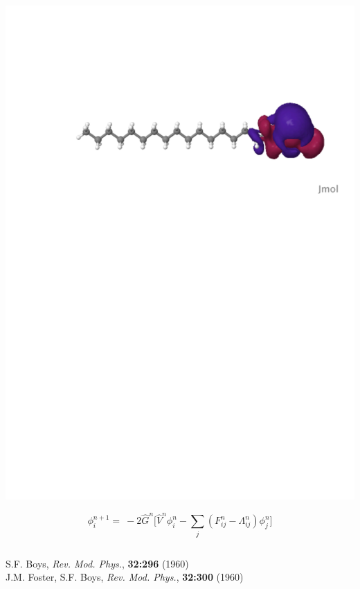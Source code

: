 \documentclass[mathserif, 10pt]{beamer}
\begin{document}
\begin{frame}
\begin{columns}
\begin{column}[b]{0.48\linewidth}
{    \includegraphics[scale=0.25, clip, viewport = 80 560 600 700]{figures/loc_orb_3.pdf}\\

    \vspace{2mm}

    \begin{equation}
        \nonumber
        \phi_i^{n+1} =\ -2\hat{G}^n\Bigg[\hat{V}^n\phi_i^n
        - \sum_j(F^n_{ij} - \Lambda^n_{ij})\phi_j^n\Bigg]
    \end{equation}
}
    \end{column}
    \end{columns}

    \vspace{6mm}

    \centering
    \tiny
    S.F. Boys,
    {\it Rev. Mod. Phys.}, 
    \textbf{32:296}
    (1960)\\
    J.M. Foster, S.F. Boys,
    {\it Rev. Mod. Phys.}, 
    \textbf{32:300}
    (1960)
\end{frame}
\end{document}
